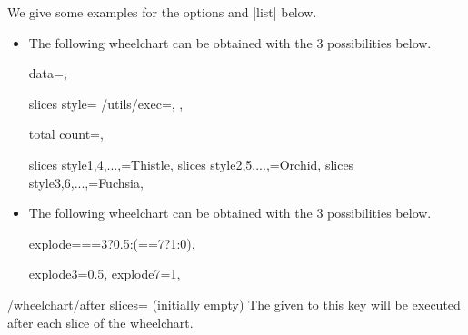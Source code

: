\documentclass[a4paper,english,dvipsnames]{ltxdoc}
\begin{document}
We give some examples for the options  and |{list}| below.
\begin{itemize}
\item The following wheelchart can be obtained with the 3 possibilities below.
\begin{codeexample}[width=10cm]
\begin{tikzpicture}
\wheelchart[
    data{list}={
        An,example,where,some,of,the,
        keys,are,given,using,a,list
    },
    slices style{list}={
        Thistle,Orchid,Fuchsia
    },
    total count=12
]{}
\end{tikzpicture}
\end{codeexample}
\begin{codeexample}[code only,preamble={\usepackage{listofitems}}]
\readlist{}

\setsepchar{ }
\readlist{}

data={\WCdata[\WCcount]},

slices style={
    /utils/exec={},
    \WCcolors[\WCcolornumber]
},

total count=\WCdatalen,
\end{codeexample}
\begin{codeexample}
slices style{1,4,...,\WCdatalen}=Thistle,
slices style{2,5,...,\WCdatalen}=Orchid,
slices style{3,6,...,\WCdatalen}=Fuchsia,
\end{codeexample}
\item The following wheelchart can be obtained with the 3 possibilities below.
\begin{codeexample}[width=10cm]
\begin{tikzpicture}
\wheelchart[
    explode=\WCvarF,
    pie
]{\exampleforthismanual}
\end{tikzpicture}
\end{codeexample}
\begin{codeexample}
explode={\WCcount==3?0.5:(\WCcount==7?1:0)},
\end{codeexample}
\begin{codeexample}
explode{3}=0.5,
explode{7}=1,
\end{codeexample}
\end{itemize}
\begin{key}{/wheelchart/after slices= (initially \normalfont empty)}
The  given to this key will be executed after each slice of the wheelchart.
\end{key}
\end{document}
